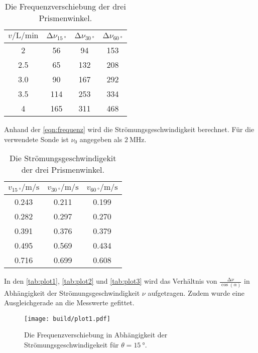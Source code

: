 \begin{table}[H]
    \centering
    \caption{Die Frequenzverschiebung der drei Prismenwinkel.}
    \label{tab:messwerte1}
\begin{tabular}{c c c c}
    \toprule
     $v / \si{\liter\per\minute}$ & $ \increment \nu_{\qty{15}{°}}$ & $\increment \nu_{\qty{30}{°}}$ & $\increment \nu_{\qty{60}{°}}$ \\
    \midrule
       2 &  56 &  94 & 153 \\
     2.5 &  65 & 132 & 208 \\
     3.0 &  90 & 167 & 292 \\
     3.5 & 114 & 253 & 334 \\
       4 & 165 & 311 & 468 \\
    \bottomrule
\end{tabular}
\end{table}

Anhand der \autoref{eqn:frequenz} wird die Strömungsgeschwindigkeit berechnet. Für die verwendete Sonde ist 
$\nu_0$ angegeben als $\SI{2}{\mega\hertz}$.

\begin{table}[H]
    \centering
    \caption{Die Strömungsgeschwindigekit der drei Prismenwinkel.}
    \label{tab:geschw}
\begin{tabular}{c c c}
    \toprule
     $v_{\qty{15}{°}} / \si{\meter \per \second}$ &  $v_{\qty{30}{°}} / \si{\meter \per \second}$ &  $v_{\qty{60}{°}} / \si{\meter \per \second}$ \\
    \midrule
       0.243 &    0.211 &    0.199 \\
       0.282 &    0.297 &    0.270 \\
       0.391 &    0.376 &    0.379 \\
       0.495 &    0.569 &    0.434 \\
       0.716 &    0.699 &    0.608 \\
    \bottomrule
    \end{tabular}
\end{table}

In den \autoref{tab:plot1}, \autoref{tab:plot2} und \autoref{tab:plot3} wird das Verhältnis von $\frac{\increment \nu}{\cos (\alpha)}$ in Abhängigkeit der Strömungsgeschwindigkeit
$\nu$ aufgetragen. Zudem wurde eine Ausgleichgerade an die Messwerte gefittet.

\begin{figure}[H]
	\texttt{[image: build/plot1.pdf]}
	\caption{Die Frequenzverschiebung in Abhängigkeit der Strömungsgeschwindigekeit für $\theta = \qty{15}{°}$.}
	\label{fig:plot1}
\end{figure}


